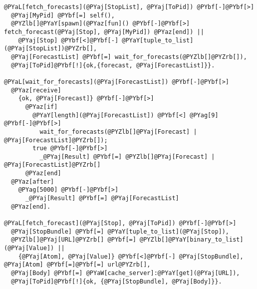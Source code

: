 \begin{Verbatim}[commandchars=@\[\]]
@PYaL[fetch_forecasts](@PYaj[StopList], @PYaj[ToPid]) @PYbf[-]@PYbf[>]
  @PYaj[MyPid] @PYbf[=] self(),
  @PYZlb[]@PYaY[spawn](@PYaz[fun]() @PYbf[-]@PYbf[>] fetch_forecast(@PYaj[Stop], @PYaj[MyPid]) @PYaz[end]) ||
    @PYaj[Stop] @PYbf[<]@PYbf[-] @PYaY[tuple_to_list](@PYaj[StopList])@PYZrb[],
  @PYaj[ForecastList] @PYbf[=] wait_for_forecasts(@PYZlb[]@PYZrb[]),
  @PYaj[ToPid]@PYbf[!]{ok,{forecast, @PYaj[ForecastList]}}.

@PYaL[wait_for_forecasts](@PYaj[ForecastList]) @PYbf[-]@PYbf[>]
  @PYaz[receive]
    {ok, @PYaj[Forecast]} @PYbf[-]@PYbf[>]
      @PYaz[if]
        @PYaY[length](@PYaj[ForecastList]) @PYbf[<] @PYag[9] @PYbf[-]@PYbf[>]
          wait_for_forecasts(@PYZlb[]@PYaj[Forecast] | @PYaj[ForecastList]@PYZrb[]);
        true @PYbf[-]@PYbf[>]
          _@PYaj[Result] @PYbf[=] @PYZlb[]@PYaj[Forecast] | @PYaj[ForecastList]@PYZrb[]
      @PYaz[end]
  @PYaz[after]
    @PYag[5000] @PYbf[-]@PYbf[>]
      _@PYaj[Result] @PYbf[=] @PYaj[ForecastList]
  @PYaz[end].

@PYaL[fetch_forecast](@PYaj[Stop], @PYaj[ToPid]) @PYbf[-]@PYbf[>]
  @PYaj[StopBundle] @PYbf[=] @PYaY[tuple_to_list](@PYaj[Stop]),
  @PYZlb[]@PYaj[URL]@PYZrb[] @PYbf[=] @PYZlb[]@PYaY[binary_to_list](@PYaj[Value]) ||
    {@PYaj[Atom], @PYaj[Value]} @PYbf[<]@PYbf[-] @PYaj[StopBundle], @PYaj[Atom] @PYbf[=]@PYbf[=] url@PYZrb[],
  @PYaj[Body] @PYbf[=] @PYaW[cache_server]:@PYaY[get](@PYaj[URL]),
  @PYaj[ToPid]@PYbf[!]{ok, {@PYaj[StopBundle], @PYaj[Body]}}.
  
\end{Verbatim}
